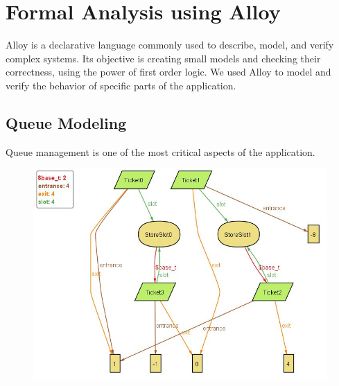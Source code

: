 \section{Formal Analysis using Alloy}
Alloy is a declarative language commonly used to describe, model, and verify complex systems.
Its objective is creating small models and checking their correctness, using the power of first order logic.
We used Alloy to model and verify the behavior of specific parts of the application.

\subsection{Queue Modeling}
Queue management is one of the most critical aspects of the application.


\begin{figure}[H]
    \centering
    \includegraphics[width=1\textwidth]{alloy/Line_Alloy.JPG}
\end{figure}


